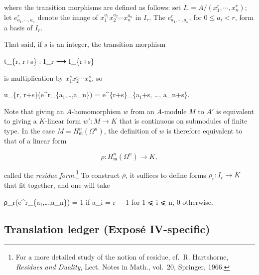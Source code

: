 \documentclass[
]{article}
\newenvironment{Shaded}{}{}
\newcommand{\NormalTok}[1]{#1}
\begin{document}
where the transition morphisms are defined as follows: set
\(I_{r} = A/(x^{r}_{1}, \cdots, x^{r}_{n})\); let
\(e^{r}_{a_{1},\cdots,a_{n}}\) denote the image of
\(x^{a_{1}}_{1} x^{a_{2}}_{2} \cdots x^{a_{n}}_{n}\) in \(I_{r}\). The
\(e^{r}_{a_{1},\cdots,a_{n}}\), for \(0 \leqslant a_{i} < r\), form a
basis of \(I_{r}\).

That said, if \(s\) is an integer, the transition morphism

\begin{Shaded}
\begin{Highlighting}[]
\NormalTok{t\_\{r, r+s\} : I\_r ⟶ I\_\{r+s\}}
\end{Highlighting}
\end{Shaded}

is multiplication by \(x^{s}_{1} x^{s}_{2} \cdots x^{s}_{n}\), so

\begin{Shaded}
\begin{Highlighting}[]
\NormalTok{u\_\{r, r+s\}(e\^{}r\_\{a₁,…,a\_n\}) = e\^{}\{r+s\}\_\{a₁+s, …, a\_n+s\}.}
\end{Highlighting}
\end{Shaded}

Note that giving an \(A\)-homomorphism \(w\) from an \(A\)-module \(M\)
to \(A'\) is equivalent to giving a \(K\)-linear form \(w' : M \to K\)
that is continuous on submodules of finite type. In the case
\(M = H^{n}_{\mathfrak{m}}(\Omega^{n})\), the definition of \(w\) is
therefore equivalent to that of a linear form

\[
\rho : H^{n}_{\mathfrak{m}}(\Omega^{n}) \longrightarrow K,
\]

called the \emph{residue form}.\footnote{For a more detailed study of
  the notion of residue, cf.~R. Hartshorne, \emph{Residues and Duality},
  Lect. Notes in Math., vol.~20, Springer, 1966.} To construct \(\rho\),
it suffices to define forms \(\rho_{r} : I_{r} \to K\) that fit
together, and one will take

\begin{Shaded}
\begin{Highlighting}[]
\NormalTok{ρ\_r(e\^{}r\_\{a₁,…,a\_n\}) =}
\NormalTok{    1   if a\_i = r − 1 for 1 ⩽ i ⩽ n,}
\NormalTok{    0   otherwise.}
\end{Highlighting}
\end{Shaded}

\subsection{Translation ledger (Exposé
IV-specific)}\label{translation-ledger-exposuxe9-iv-specific}
\end{document}
